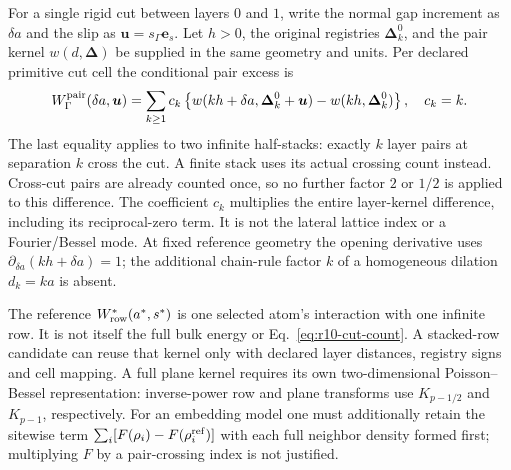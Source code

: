 \documentclass[11pt]{article}
\begin{document}
For a single rigid cut between layers $0$ and $1$, write the normal gap
increment as $\delta a$ and the slip as
$\boldsymbol u=s_\Gamma\boldsymbol e_s$.
Let $h>0$, the original registries $\boldsymbol\Delta_k^0$, and the
pair kernel $w(d,\boldsymbol\Delta)$ be supplied in the same geometry
and units.  Per declared primitive cut cell the conditional pair excess is
\begin{equation}
 W_\Gamma^{\rm pair}(\delta a,\boldsymbol u)
 =\sum_{k\ge1}c_k
 \left\{w(kh+\delta a,\boldsymbol\Delta_k^0+\boldsymbol u)
            -w(kh,\boldsymbol\Delta_k^0)\right\},
 \quad c_k=k .
 \label{eq:r10-cut-count}
\end{equation}
The last equality applies to two infinite half-stacks: exactly $k$
layer pairs at separation $k$ cross the cut.  A finite stack uses its
actual crossing count instead.  Cross-cut pairs are already counted
once, so no further factor $2$ or $1/2$ is applied to this difference.
The coefficient $c_k$ multiplies the entire layer-kernel difference,
including its reciprocal-zero term.  It is not the lateral lattice
index or a Fourier/Bessel mode.  At fixed reference geometry the opening
derivative uses $\partial_{\delta a}(kh+\delta a)=1$; the additional
chain-rule factor $k$ of a homogeneous dilation $d_k=ka$ is absent.

The reference $W_{\rm row}^*(a^*,s^*)$ is one selected atom's interaction with one
infinite row.  It is not itself the full bulk energy or
Eq.~\eqref{eq:r10-cut-count}.  A stacked-row candidate can reuse that
kernel only with declared layer distances, registry signs and cell
mapping.  A full plane kernel requires its own two-dimensional
Poisson--Bessel representation: inverse-power row and plane transforms
use $K_{p-1/2}$ and $K_{p-1}$, respectively.
For an embedding model one must additionally retain the sitewise term
$\sum_i[F(\rho_i)-F(\rho_i^{\rm ref})]$ with each full neighbor density
formed first; multiplying $F$ by a pair-crossing index is not justified.
\end{document}
